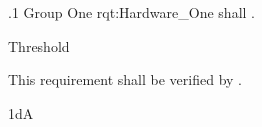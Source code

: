 \ONERQMTV
{\RqtNumberBase.1}
{Group One}
{rqt:Hardware_One}
{\ThisSys shall \TBD.}
{
	\item [Phase 1] Threshold
}
{This requirement shall be verified by \TBD.}
{
	\item [\cite{ref__BDP_FOS_CDD}] \TBD
}
{
	\item \TBD
}
{1dA}

